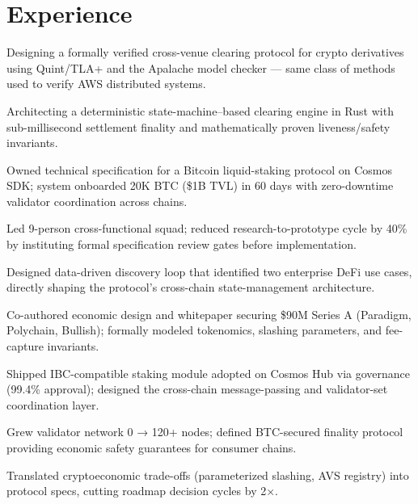 \documentclass[]{plushcv}
\begin{document}
\begin{minipage}[t]{0.70\textwidth} 



\section{Experience}
\vspace{\topsep} %
\begin{tightemize}
\sectionsep
\item Designing a formally verified cross-venue clearing protocol for crypto derivatives using Quint/TLA+ and the Apalache model checker — same class of methods used to verify AWS distributed systems.
\item Architecting a deterministic state-machine–based clearing engine in Rust with sub-millisecond settlement finality and mathematically proven liveness/safety invariants.
\end{tightemize}
\sectionsep

\begin{tightemize}
\sectionsep
\item Owned technical specification for a Bitcoin liquid-staking protocol on Cosmos SDK; system onboarded 20K BTC (\$1B TVL) in 60 days with zero-downtime validator coordination across chains.
\item Led 9-person cross-functional squad; reduced research-to-prototype cycle by 40\% by instituting formal specification review gates before implementation.
\item Designed data-driven discovery loop that identified two enterprise DeFi use cases, directly shaping the protocol's cross-chain state-management architecture.
\end{tightemize}
\sectionsep

\begin{tightemize}
\sectionsep
\item Co-authored economic design and whitepaper securing \$90M Series A (Paradigm, Polychain, Bullish); formally modeled tokenomics, slashing parameters, and fee-capture invariants.
\item Shipped IBC-compatible staking module adopted on Cosmos Hub via governance (99.4\% approval); designed the cross-chain message-passing and validator-set coordination layer.
\item Grew validator network 0 → 120+ nodes; defined BTC-secured finality protocol providing economic safety guarantees for consumer chains.
\item Translated cryptoeconomic trade-offs (parameterized slashing, AVS registry) into protocol specs, cutting roadmap decision cycles by 2×.
\end{tightemize}
\sectionsep


\end{minipage}
\end{document}
